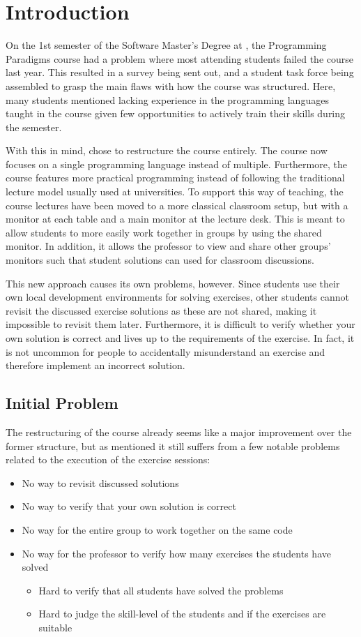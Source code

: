 \chapter{Introduction} \label{chap:introduction}
On the 1st semester of the Software Master’s Degree at \aau{}, the Programming Paradigms course had a problem where most attending students failed the course last year. 
This resulted in a survey being sent out, and a student task force being assembled to grasp the main flaws with how the course was structured. 
Here, many students mentioned lacking experience in the programming languages taught in the course given few opportunities to actively train their skills during the semester. 


With this in mind, \aau{} chose to restructure the course entirely. 
The course now focuses on a single programming language instead of multiple. 
Furthermore, the course features more practical programming instead of following the traditional lecture model usually used at universities. 
To support this way of teaching, the course lectures have been moved to a more classical classroom setup, but with a monitor at each table and a main monitor at the lecture desk. 
This is meant to allow students to more easily work together in groups by using the shared monitor.
In addition, it allows the professor to view and share other groups' monitors such that student solutions can used for classroom discussions. 


This new approach causes its own problems, however. 
Since students use their own local development environments for solving exercises, other students cannot revisit the discussed exercise solutions as these are not shared, making it impossible to revisit them later. 
Furthermore, it is difficult to verify whether your own solution is correct and lives up to the requirements of the exercise. 
In fact, it is not uncommon for people to accidentally misunderstand an exercise and therefore implement an incorrect solution.

\section{Initial Problem} \label{sec:initial-problem}
The restructuring of the course already seems like a major improvement over the former structure, but as mentioned it still suffers from a few notable problems related to the execution of the exercise sessions:
\begin{itemize}
	\item No way to revisit discussed solutions
	\item No way to verify that your own solution is correct
	\item No way for the entire group to work together on the same code
	\item No way for the professor to verify how many exercises the students have solved
	\begin{itemize}
		\item Hard to verify that all students have solved the problems
		\item Hard to judge the skill-level of the students and if the exercises are suitable
	\end{itemize}
\end{itemize}

